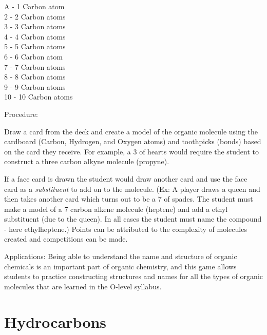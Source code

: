 \begin{multicols}{2}
\begin{description*}
{A - 1 Carbon atom\\
2 - 2 Carbon atoms\\
3 - 3 Carbon atoms\\
4 - 4 Carbon atoms\\
5 - 5 Carbon atoms\\
6 - 6 Carbon atom\\
7 - 7 Carbon atoms\\
8 - 8 Carbon atoms\\
9 - 9 Carbon atoms\\
10 - 10 Carbon atoms\\}
\item[Procedure:]{Draw a card from the deck and create a model of the organic molecule using the cardboard (Carbon, Hydrogen, and Oxygen atoms) and toothpicks (bonds) based on the card they receive. For example, a 3 of hearts would require the student to construct a three carbon alkyne molecule (propyne). 

If a face card is drawn the student would draw another card and use the face card as a \emph{substituent} to add on to the molecule. (Ex: A player draws a queen and then takes another card which turns out to be a 7 of spades. The student must make a model of a 7 carbon alkene molecule (heptene) and add a ethyl substituent (due to the queen). In all cases the student must name the compound - here ethylheptene.) Points can be attributed to the complexity of molecules created and competitions can be made.}
\item[Applications:]{Being able to understand the name and structure of organic chemicals is an important part of organic chemistry, and this game allows students to practice constructing structures and names for all the types of organic molecules that are learned in the O-level syllabus.}
\end{description*}


\section*{Hydrocarbons}



\end{multicols}
